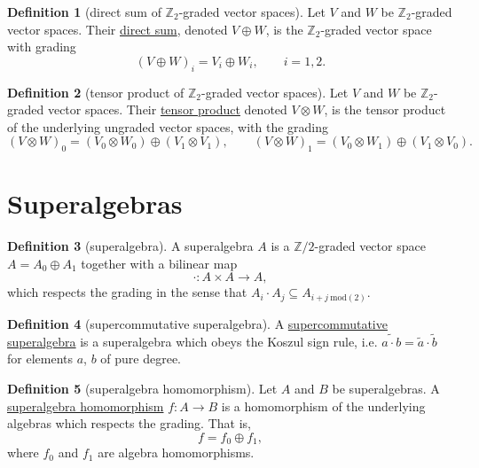 \documentclass[a4paper,10pt]{scrreprt}
\newcommand{\Z}{\mathbb{Z}}
\newcommand{\defn}[1]{\ul{#1}}
\theoremstyle{definition}
\newtheorem{definition}{Definition}[section]
\theoremstyle{plain}
\theoremstyle{remark}
\begin{document}
\begin{definition}[direct sum of $\Z_{2}$-graded vector spaces]
  \label{def:directsumofz2gradedvectorspaces}
  Let $V$ and $W$ be $\Z_{2}$-graded vector spaces. Their \defn{direct sum}, denoted $V \oplus W$, is the $\Z_{2}$-graded vector space with grading
  \begin{equation*}
    (V \oplus W)_{i} = V_{i} \oplus W_{i},\qquad i = 1, 2.
  \end{equation*}
\end{definition} 
\begin{definition}[tensor product of $\Z_{2}$-graded vector spaces]
  \label{def:tensorproduttofz2gradedvectorspaces}
  Let $V$ and $W$ be $\Z_{2}$-graded vector spaces. Their \defn{tensor product} denoted $V \otimes W$, is the tensor product of the underlying ungraded vector spaces, with the grading
  \begin{equation*}
    (V \otimes W)_{0} = (V_{0} \otimes W_{0})\oplus(V_{1} \otimes V_{1}),\qquad (V \otimes W)_{1} = (V_{0} \otimes W_{1})\oplus(V_{1} \otimes V_{0}).
  \end{equation*}
\end{definition}

\section{Superalgebras}

\begin{definition}[superalgebra]
  \label{def:superalgebra}
  A superalgebra $A$ is a $\Z/2$-graded vector space $A = A_{0} \oplus A_{1}$ together with a bilinear map
  \begin{equation*}
    \cdot\colon A \times A \to A,
  \end{equation*}
  which respects the grading in the sense that $A_{i} \cdot A_{j} \subseteq A_{i+j\ \mathrm{mod}(2)}$.
\end{definition}

\begin{definition}[supercommutative superalgebra]
  \label{def:supercommutativesuperalgebra}
  A \defn{supercommutative superalgebra} is a superalgebra which obeys the Koszul sign rule, i.e.  $\widetilde{a \cdot b} = \tilde{a} \cdot \tilde{b}$ for elements $a$, $b$ of pure degree.
\end{definition}

\begin{definition}[superalgebra homomorphism]
  \label{def:superalgebrahomomorphism}
  Let $A$ and $B$ be superalgebras. A \defn{superalgebra homomorphism} $f\colon A \to B$ is a homomorphism of the underlying algebras which respects the grading. That is, 
  \begin{equation*}
    f = f_{0} \oplus f_{1},
  \end{equation*}
  where $f_{0}$ and $f_{1}$ are algebra homomorphisms.
\end{definition}
\end{document}
